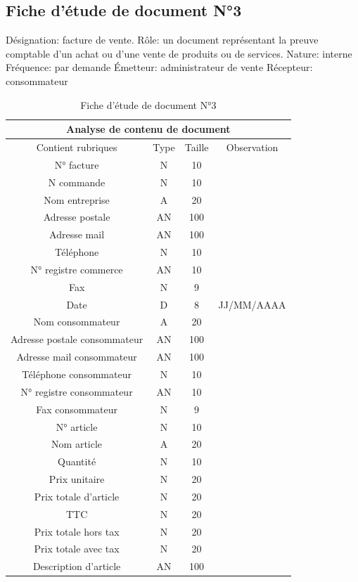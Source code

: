 \documentclass[edit,12pt,a4paper,ChapStyle,oneside,doubleinterligne]{report}
\begin{document}
\newpage
\subsection{Fiche d’étude de document N°3}
\noindent Désignation: facture de vente.
\newline Rôle: un document représentant la preuve comptable d'un achat ou d'une vente de produits ou de services.
\newline Nature: interne
\newline Fréquence: par demande
\newline Émetteur: administrateur de vente
\newline Récepteur: consommateur \cite{facturev}
\begin{table}[h!]
    \centering
    \begin{tabular}{|c|c|c|c|}
         \hline
\multicolumn{4}{|c|}{Analyse de contenu de document}\\
\hline
Contient rubriques & Type & Taille & Observation\\
\hline
 N° facture  & N & 10 & \\
 N commande  & N & 10 & \\
 Nom entreprise & A & 20 & \\
 Adresse postale & AN & 100 & \\
 Adresse mail & AN & 100 & \\
 Téléphone & N & 10 & \\
 N° registre commerce & AN & 10 & \\
 Fax & N & 9 & \\
Date & D & 8 & JJ/MM/AAAA \\
Nom consommateur & A & 20 & \\
Adresse postale consommateur & AN & 100 & \\
Adresse mail consommateur & AN & 100 & \\
Téléphone consommateur & N & 10 & \\
N° registre consommateur & AN & 10 & \\
Fax consommateur & N & 9 & \\
N° article & N & 10 & \\
Nom article & A & 20 & \\
Quantité & N & 10 & \\
Prix unitaire & N & 20 & \\
Prix totale d’article & N & 20 & \\
TTC & N & 20 & \\
Prix totale hors tax & N & 20 & \\
Prix totale avec tax & N & 20 & \\
Description d’article & AN & 100 & \\
\hline
    \end{tabular}
    \caption{Fiche d’étude de document N°3}
    \label{tab:3}
\end{table}
\end{document}
